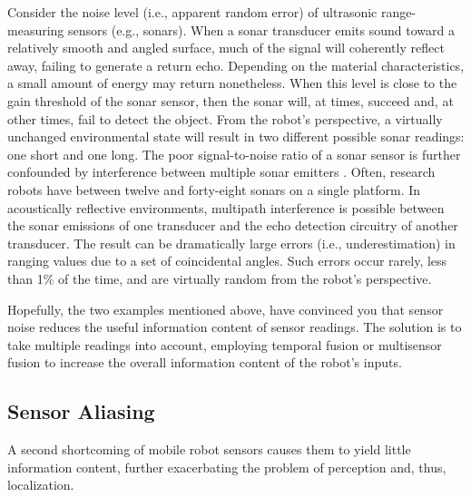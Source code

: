 \begin{framed}
\begin{exmp}

Consider the noise level (i.e., apparent random error) of ultrasonic range-measuring sensors (e.g., sonars). 
When a sonar transducer emits sound
toward a relatively smooth and angled surface, much of the signal will coherently reflect
away, failing to generate a return echo. Depending on the material characteristics, a small
amount of energy may return nonetheless. When this level is close to the gain threshold of
the sonar sensor, then the sonar will, at times, succeed and, at other times, fail to detect the
object. From the robot’s perspective, a virtually unchanged environmental state will result
in two different possible sonar readings: one short and one long. The poor signal-to-noise ratio of a sonar sensor 
is further confounded by interference between multiple sonar emitters \cite{Siegwart2011}. 
Often, research robots have between twelve and forty-eight sonars on a single platform. In acoustically reflective environments, multipath 
interference is possible between the sonar emissions of one transducer and the echo detection
circuitry of another transducer. The result can be dramatically large errors (i.e., underestimation) 
in ranging values due to a set of coincidental angles. Such errors occur rarely, less
than 1\% of the time, and are virtually random from the robot’s perspective.

\end{exmp}
\end{framed}

Hopefully, the two examples mentioned above, have convinced you that sensor noise reduces the useful information content of sensor readings.
The solution is to take multiple readings into account, employing temporal fusion
or multisensor fusion to increase the overall information content of the robot’s inputs.

\subsection{ Sensor Aliasing}
\label{sensor_aliasing}

A second shortcoming of mobile robot sensors causes them to yield little information content, 
further exacerbating the problem of perception and, thus, localization. 


